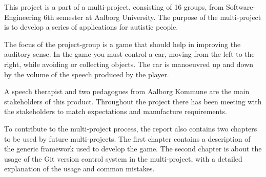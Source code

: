 This project is a part of a multi-project, consisting of 16 groups, from Software-Engineering 6th semester at Aalborg University.
The purpose of the multi-project is to develop a series of applications for autistic people.

The focus of the project-group is a game that should help in improving the auditory sense.
In the game you must control a car, moving from the left to the right, while avoiding or collecting objects.
The car is manoeuvred up and down by the volume of the speech produced by the player.

A speech therapist and two pedagogues from Aalborg Kommune are the main stakeholders of this product.
Throughout the project there has been meeting with the stakeholders to match expectations and manufacture requirements.

To contribute to the multi-project process, the report also contains two chapters to be used by future multi-projects. The first chapter contains a description of the generic framework used to develop the game.
The second chapter is about the usage of the Git version control system in the multi-project, with a detailed explanation of the usage and common mistakes.